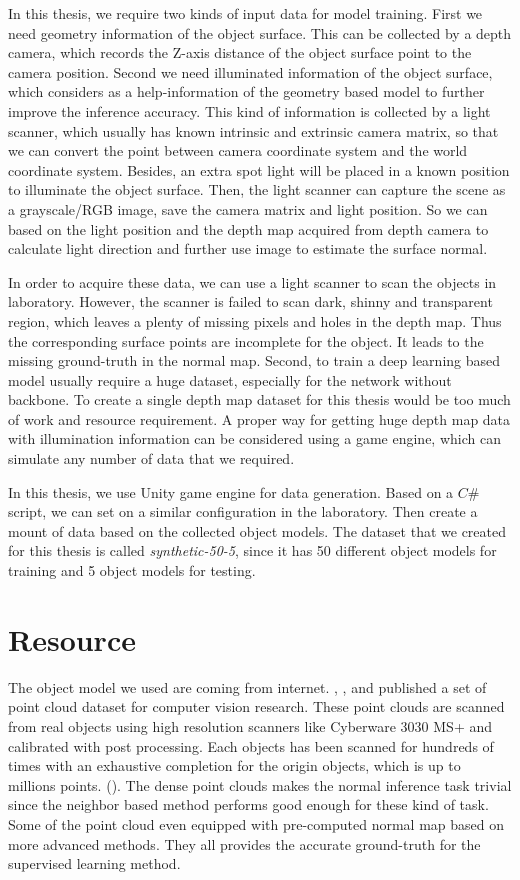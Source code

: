 \documentclass[border=15pt, multi, tikz]{article}
\begin{document}
 In this thesis, we require two kinds of input data for model training. 
 First we need geometry information of the object surface. This can be collected by a depth camera, which records the Z-axis distance of the object surface point to the camera position. 
 Second we need illuminated information of the object surface, which considers as a help-information of the geometry based model to further improve the inference accuracy. This kind of information is collected by a light scanner, which usually has known intrinsic and extrinsic camera matrix, so that we can convert the point between camera coordinate system and the world coordinate system. Besides, an extra spot light will be placed in a known position to illuminate the object surface. Then, the light scanner can capture the scene as a grayscale/RGB image, save the camera matrix and light position. So we can based on the light position and the depth map acquired from depth camera to calculate light direction and further use image to estimate the surface normal.
 
 In order to acquire these data, we can use a light scanner to scan the objects in laboratory. However, the scanner is failed to scan dark, shinny and transparent region, which leaves a plenty of missing pixels and holes in the depth map. Thus the corresponding surface points are incomplete for the object. It leads to the missing ground-truth in the normal map. Second, to train a deep learning based model usually require a huge dataset, especially for the network without backbone. To create a single depth map dataset for this thesis would be too much of work and resource requirement. A proper way for getting huge depth map data with illumination information can be considered using a game engine, which can simulate any number of data that we required.
 
 In this thesis, we use Unity game engine for data generation. Based on a $ C\# $ script, we can set on a similar configuration in the laboratory. Then create a mount of data based on the collected object models. The dataset that we created for this thesis is called \textit{synthetic-50-5}, since it has 50 different object models for training and 5 object models for testing.



\section{Resource}
The object model we used are coming from internet.
\cite{data1}, \cite{data2}, \cite{data3} and \cite{data4} published a set of point cloud dataset for computer vision research. These point clouds are scanned from real objects using high resolution scanners like Cyberware 3030 MS+ and calibrated with post processing. Each objects has been scanned for hundreds of times with an exhaustive completion for the origin objects, which is up to millions points. (\cite{data1}). The dense point clouds makes the normal inference task trivial since the neighbor based method performs good enough for these kind of task. Some of the point cloud even equipped with pre-computed normal map based on more advanced methods. They all provides the accurate ground-truth for the supervised learning method.
\end{document}
